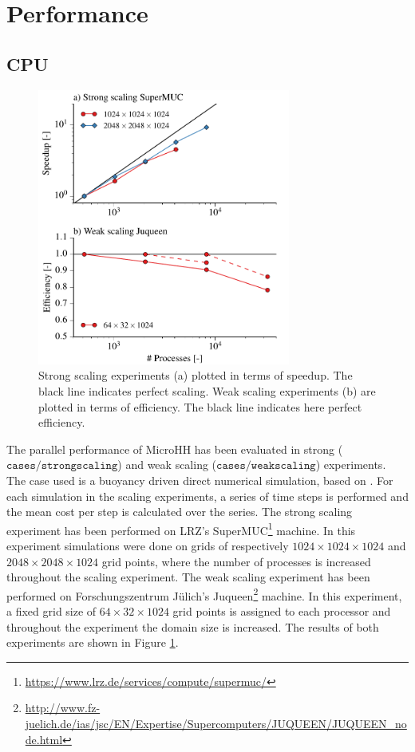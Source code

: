 \documentclass[gmd]{copernicus}
\begin{document}
\section{Performance}\label{sec:performance}
\subsection{CPU}
\begin{figure}[!hbt]
	\vspace*{2mm}
	\begin{center}
		\includegraphics[width=8.3cm]{figs/scaling.pdf}
	\end{center}
	\caption{Strong scaling experiments (a) plotted in terms of speedup. The black line indicates perfect scaling. Weak scaling experiments (b) are plotted in terms of efficiency. The black line indicates here perfect efficiency. }\label{fig:scaling}
\end{figure}
The parallel performance of MicroHH has been evaluated in strong ($\texttt{cases/strongscaling}$) and weak scaling ($\texttt{cases/weakscaling}$) experiments. The case used is a buoyancy driven direct numerical simulation, based on \citet{vanHeerwaarden2014}. For each simulation in the scaling experiments, a series of time steps is performed and the mean cost per step is calculated over the series. The strong scaling experiment has been performed on LRZ's SuperMUC\footnote{\url{https://www.lrz.de/services/compute/supermuc/}} machine. In this experiment simulations were done on grids of respectively $1024 \times 1024 \times 1024$ and $2048 \times 2048 \times 1024$ grid points, where the number of processes is increased throughout the scaling experiment. The weak scaling experiment has been performed on Forschungszentrum J\"{u}lich's Juqueen\footnote{\url{http://www.fz-juelich.de/ias/jsc/EN/Expertise/Supercomputers/JUQUEEN/JUQUEEN_node.html}} machine. In this experiment, a fixed grid size of $64 \times 32 \times 1024$ grid points is assigned to each processor and throughout the experiment the domain size is increased. The results of both experiments are shown in Figure \ref{fig:scaling}.
\end{document}
